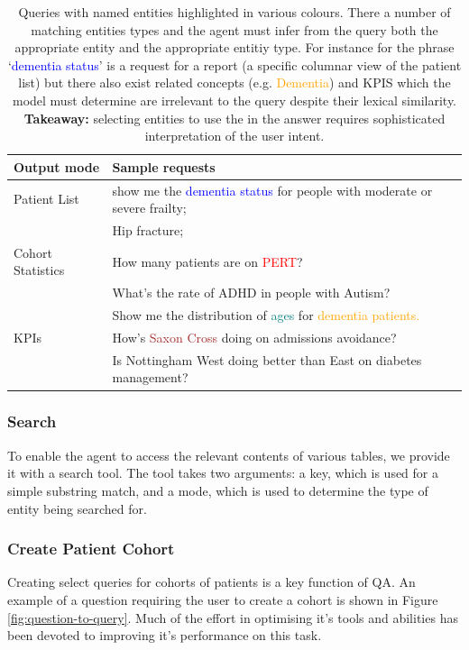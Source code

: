 \documentclass[11pt]{article}
\begin{document}
\begin{table}[t]
\centering
\begin{tabular}{|p{2cm}|p{5cm}|}
\hline
	Output mode & Sample requests \\
\hline
\hline
	Patient List	& show me the \textcolor{blue}{dementia status} for people with moderate or severe frailty; \\
			& Hip fracture; \\ 
\hline
	Cohort Statistics 	& How many patients are on \textcolor{red}{PERT}? \\
				& What's the rate of ADHD in people with Autism? \\
				& Show me the distribution of \textcolor{teal}{ages} for \textcolor{orange}{dementia patients.} \\
\hline
	KPIs 	& How's \textcolor{brown}{Saxon Cross} doing on admissions avoidance? \\
		& Is Nottingham West doing better than East on diabetes management? \\	
\hline
\end{tabular}
\caption{
	Queries with named entities highlighted in various colours.
	There a number of matching entities types and the agent must infer from the query both the appropriate entity and the appropriate entitiy type.
	For instance for the phrase `\textcolor{blue}{dementia status}' is a request for a report (a specific columnar view of the patient list) but there also exist related
	concepts (e.g. \textcolor{orange}{Dementia}) and KPIS which the model must determine are irrelevant to the query despite their lexical similarity.
	\\ \textbf{Takeaway:} selecting entities to use the in the answer requires sophisticated interpretation of the user intent.  
}
\label{tab:sample-queries}
\end{table}

\subsubsection{Search}
To enable the agent to access the relevant contents of various tables, we provide it with a search tool.
The tool takes two arguments: a key, which is used for a simple substring match, and a mode, which is used to determine the type of entity being searched
for.

\subsubsection{Create Patient Cohort}
Creating select queries for cohorts of patients is a key function of QA.
An example of a question requiring the user to create a cohort is shown in Figure \ref{fig:question-to-query}.
Much of the effort in optimising it's tools and abilities has been devoted to improving it's performance on this task.
\end{document}

